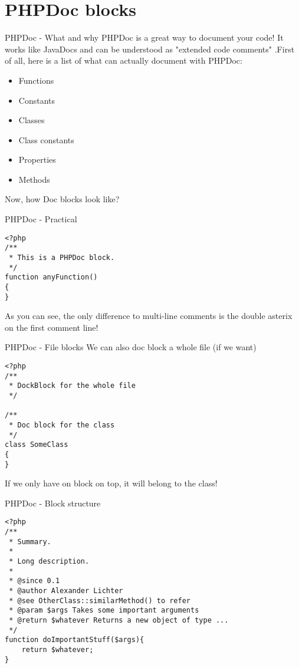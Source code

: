 \section{PHPDoc blocks}

\begin{frame}[fragile]{PHPDoc - What and why}
	PHPDoc is a great way to document your code! It works like JavaDocs and can be understood as "extended code comments" .\pause First of all, here is a list of what can actually document with PHPDoc:
	\begin{itemize}
	    \item Functions
	    \item Constants
	    \item Classes
	    \item Class constants
	    \item Properties
	    \item Methods
	\end{itemize}
	\pause
	
	Now, how Doc blocks look like?
\end{frame}

\begin{frame}[fragile]{PHPDoc - Practical}
\begin{lstlisting}
<?php
/**
 * This is a PHPDoc block.
 */
function anyFunction()
{
}
\end{lstlisting}
\pause
As you can see, the only difference to multi-line comments is the double asterix on the first comment line!\pause
\end{frame}

\begin{frame}[fragile]{PHPDoc - File blocks}
We can also doc block a whole file (if we want) \pause
\begin{lstlisting}
<?php
/**
 * DockBlock for the whole file
 */

/**
 * Doc block for the class
 */
class SomeClass
{
}
\end{lstlisting}
\pause

If we only have on block on top, it will belong to the class!
\end{frame}

\begin{frame}[fragile]{PHPDoc - Block structure}
\begin{lstlisting}
<?php
/**
 * Summary.
 *
 * Long description.
 *
 * @since 0.1
 * @author Alexander Lichter
 * @see OtherClass::similarMethod() to refer
 * @param $args Takes some important arguments
 * @return $whatever Returns a new object of type ...
 */
function doImportantStuff($args){
    return $whatever;
}
\end{lstlisting}
\end{frame}


